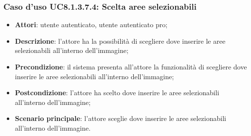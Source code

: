 \subsubsection{Caso d'uso UC8.1.3.7.4: Scelta aree selezionabili}
\begin{itemize}
	\item \textbf{Attori}: utente autenticato, utente autenticato pro;
	\item \textbf{Descrizione}: l'attore ha la possibilità di scegliere dove inserire le aree selezionabili all'interno dell'immagine;
	\item \textbf{Precondizione}: il sistema presenta all'attore la funzionalità di scegliere dove inserire le aree selezionabili all'interno dell'immagine; 	
	\item \textbf{Postcondizione}: l'attore ha scelto dove inserire le aree selezionabili all'interno dell'immagine;
	\item \textbf{Scenario principale}: l'attore sceglie dove inserire le aree selezionabili all'interno dell'immagine. 	
\end{itemize}

